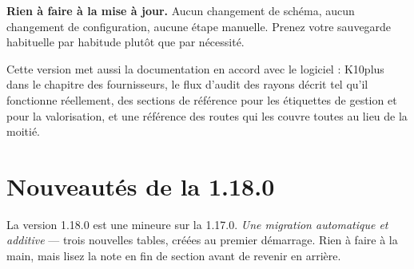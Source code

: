 \begin{note}
\textbf{Rien à faire à la mise à jour.} Aucun changement de schéma,
aucun changement de configuration, aucune étape manuelle. Prenez votre
sauvegarde habituelle par habitude plutôt que par nécessité.
\end{note}

Cette version met aussi la documentation en accord avec le logiciel :
K10plus dans le chapitre des fournisseurs, le flux d'audit des rayons
décrit tel qu'il fonctionne réellement, des sections de référence pour
les étiquettes de gestion et pour la valorisation, et une référence des
routes qui les couvre toutes au lieu de la moitié.

\section{Nouveautés de la 1.18.0}\label{sec:whats-new-1.18.0}

La version 1.18.0 est une mineure sur la 1.17.0. \emph{Une migration
automatique et additive} \string— trois nouvelles tables, créées au
premier démarrage. Rien à faire à la main, mais lisez la note en fin de
section avant de revenir en arrière.

